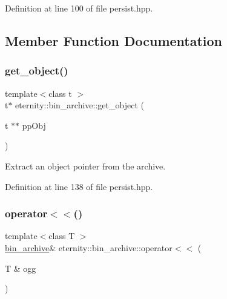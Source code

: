 Definition at line 100 of file persist.\+hpp.



\subsection{Member Function Documentation}
\mbox{\label{classeternity_1_1bin__archive_a4c9b0ab9146c3a9ccaa5ec745299b282}} 
\subsubsection{\texorpdfstring{get\+\_\+object()}{get\_object()}}
{\footnotesize\ttfamily template$<$class t $>$ \\
t$\ast$ eternity\+::bin\+\_\+archive\+::get\+\_\+object (\begin{DoxyParamCaption}\item[{t $\ast$$\ast$}]{pp\+Obj }\end{DoxyParamCaption})\hspace{0.3cm}{\ttfamily [inline]}}



Extract an object pointer from the archive. 



Definition at line 138 of file persist.\+hpp.

\mbox{\label{classeternity_1_1bin__archive_a451f9bd713b83922890014af88d386e6}} 
\subsubsection{\texorpdfstring{operator$<$$<$()}{operator<<()}\hspace{0.1cm}{\footnotesize\ttfamily [1/2]}}
{\footnotesize\ttfamily template$<$class T $>$ \\
\hyperlink{classeternity_1_1bin__archive}{bin\+\_\+archive}\& eternity\+::bin\+\_\+archive\+::operator$<$$<$ (\begin{DoxyParamCaption}\item[{T \&}]{ogg }\end{DoxyParamCaption})\hspace{0.3cm}{\ttfamily [inline]}}

